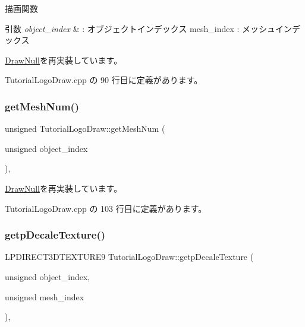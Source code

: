 描画関数 


\begin{DoxyParams}{引数}
{\em object\+\_\+index} & \+: オブジェクトインデックス mesh\+\_\+index \+: メッシュインデックス \\
\hline
\end{DoxyParams}


\mbox{\hyperlink{class_draw_null_afe50f6fd820b18d673f70f048743f339}{Draw\+Null}}を再実装しています。



 Tutorial\+Logo\+Draw.\+cpp の 90 行目に定義があります。

\mbox{\label{class_tutorial_logo_draw_a0e56784e25f1f83e6ff167280b801aad}} 
\subsubsection{\texorpdfstring{get\+Mesh\+Num()}{getMeshNum()}}
{\footnotesize\ttfamily unsigned Tutorial\+Logo\+Draw\+::get\+Mesh\+Num (\begin{DoxyParamCaption}\item[{unsigned}]{object\+\_\+index }\end{DoxyParamCaption})\hspace{0.3cm}{\ttfamily [override]}, {\ttfamily [virtual]}}



\mbox{\hyperlink{class_draw_null_a7586cc78eed6bcaf2972ad7a6a70e665}{Draw\+Null}}を再実装しています。



 Tutorial\+Logo\+Draw.\+cpp の 103 行目に定義があります。

\mbox{\label{class_tutorial_logo_draw_abf06755b745dc62341a817a58d377659}} 
\subsubsection{\texorpdfstring{getp\+Decale\+Texture()}{getpDecaleTexture()}}
{\footnotesize\ttfamily L\+P\+D\+I\+R\+E\+C\+T3\+D\+T\+E\+X\+T\+U\+R\+E9 Tutorial\+Logo\+Draw\+::getp\+Decale\+Texture (\begin{DoxyParamCaption}\item[{unsigned}]{object\+\_\+index,  }\item[{unsigned}]{mesh\+\_\+index }\end{DoxyParamCaption})\hspace{0.3cm}{\ttfamily [override]}, {\ttfamily [virtual]}}




